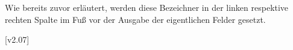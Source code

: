 \begin{Bundle*}{}
\begin{Declaration}{}
\begin{Declaration}{}
\begin{Declaration}{}
\printdeclarationlist%
%
Wie bereits zuvor erläutert, werden diese Bezeichner in der linken respektive 
rechten Spalte im Fuß vor der Ausgabe der eigentlichen Felder gesetzt.
\end{Declaration}
\end{Declaration}
\end{Declaration}

[v2.07]
\end{Bundle*}
